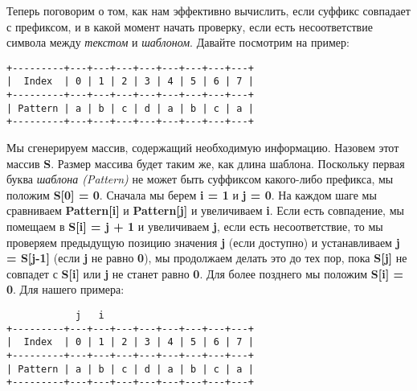 Теперь поговорим о том, как нам эффективно вычислить, если суффикс совпадает с префиксом, и в
какой момент начать проверку, если есть несоответствие символа между \textit{текстом} и \textit{шаблоном}. Давайте
посмотрим на пример:
\vspace{\baselineskip}
\begin{tcolorbox}
\begin{verbatim}
+---------+---+---+---+---+---+---+---+---+
|  Index  | 0 | 1 | 2 | 3 | 4 | 5 | 6 | 7 |
+---------+---+---+---+---+---+---+---+---+
| Pattern | a | b | c | d | a | b | c | a |
+---------+---+---+---+---+---+---+---+---+
\end{verbatim}
\end{tcolorbox}
\vspace{\baselineskip}

Мы сгенерируем массив, содержащий необходимую информацию. Назовем этот массив \textbf{S}. Размер
массива будет таким же, как длина шаблона. Поскольку первая буква \textit{шаблона (Pattern)} не может быть
суффиксом какого-либо префикса, мы положим \textbf{S[0] = 0}. Сначала мы берем \textbf{i = 1} и \textbf{j = 0}. На каждом шаге
мы сравниваем \textbf{Pattern[i]} и \textbf{Pattern[j]} и увеличиваем \textbf{i}. Если есть совпадение, мы помещаем в \textbf{S[i] = j + 1}
и увеличиваем \textbf{j}, если есть несоответствие, то мы проверяем предыдущую позицию значения \textbf{j} (если
доступно) и устанавливаем \textbf{j = S[j-1]} (если \textbf{j} не равно \textbf{0}), мы продолжаем делать это до тех пор, пока \textbf{S[j]}
не совпадет с \textbf{S[i]} или \textbf{j} не станет равно \textbf{0}. Для более позднего мы положим \textbf{S[i] = 0}. Для нашего примера:
\vspace{\baselineskip}
\begin{tcolorbox}
\begin{verbatim}
            j   i
+---------+---+---+---+---+---+---+---+---+
|  Index  | 0 | 1 | 2 | 3 | 4 | 5 | 6 | 7 |
+---------+---+---+---+---+---+---+---+---+
| Pattern | a | b | c | d | a | b | c | a |
+---------+---+---+---+---+---+---+---+---+
\end{verbatim}
\end{tcolorbox}
\vspace{\baselineskip}


